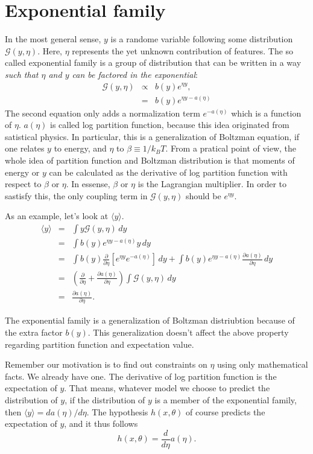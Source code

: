 \section{Exponential family}
In the most general sense, $y$ is a randome variable following some distribution $\mathcal G(y, \eta)$. Here, $\eta$ represents the yet unknown contribution of features. The so called exponential family is a group of distribution that can be written in a way \emph{such that $\eta$ and $y$ can be factored in the exponential}:
\begin{eqnarray}
	\mathcal G(y, \eta) &\propto& b(y)e^{\eta y},\\
			 &=& b(y)e^{\eta y - a(\eta)}\label{eqn:exponential-family}
\end{eqnarray}
The second equation only adds a normalization term $e^{-a(\eta)}$ which is a function of $\eta$. $a(\eta)$ is called log partition function, because this idea originated from satistical physics. In particular, this is a generalization of Boltzman equation, if one relates $y$ to energy, and $\eta$ to $\beta\equiv 1/k_BT$. From a pratical point of view, the whole idea of partition function and Boltzman distribution is that moments of energy or $y$ can be calculated as the derivative of log partition function with respect to $\beta$ or $\eta$. In essense, $\beta$ or $\eta$ is the Lagrangian multiplier. In order to sastisfy this, the only coupling term in $\mathcal G(y, \eta)$ should be $e^{\eta y}$.

As an example, let's look at $\langle y\rangle$.
\begin{eqnarray}
	\langle y\rangle &=&\int y\mathcal G(y, \eta)\, dy\\
		   &=&\int b(y)e^{\eta y -a(\eta)}y\,dy\\
     &=&\int b(y)\frac{\partial}{\partial\eta}\left[e^{\eta y}e^{-a(\eta)}\right]\,dy + \int b(y)e^{\eta y-a(\eta)}\frac{\partial a(\eta)}{\partial\eta}\,dy\\
	&=&(\frac{\partial}{\partial\eta}+ \frac{\partial a(\eta)}{\partial\eta})\int \mathcal G(y, \eta)\, dy\\
	&=&\frac{\partial a(\eta)}{\partial\eta}.\label{eqn:average}
\end{eqnarray}

The exponential family is a generalization of Boltzman distriubtion because of the extra factor $b(y)$. This generalization doesn't affect the above property regarding partition function and expectation value.

Remember our motivation is to find out constraints on $\eta$ using only mathematical facts. We already have one. The derivative of log partition function is the expectation of $y$. That means, whatever model we choose to predict the distribution of $y$, if the distribution of $y$ is a member of the exponential family, then $\langle y\rangle=da(\eta)/d\eta$. The hypothesis $h(x, \theta)$ of course predicts the expectation of $y$, and it thus follows
\begin{equation}
	h(x, \theta) = \frac{d}{d\eta}a(\eta). \label{eqn:exponential_hypo}
\end{equation}


